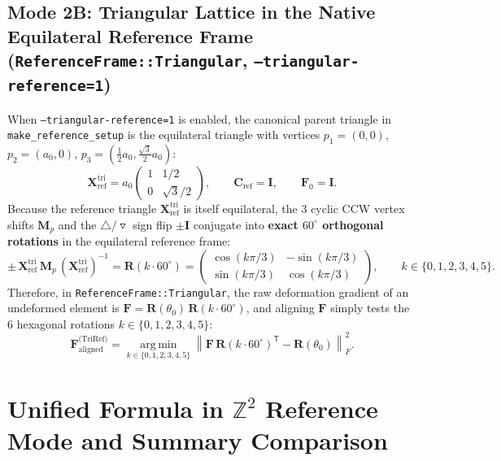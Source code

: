 \documentclass[11pt,a4paper]{article}
\newcommand{\Z}{\mathbb{Z}}
\newcommand{\T}{^{\mathsf T}}
\newcommand{\code}[1]{\texttt{#1}}
\begin{document}
\subsection{Mode 2B: Triangular Lattice in the Native Equilateral Reference Frame (\code{ReferenceFrame::Triangular}, \code{--triangular-reference=1})}
When \code{--triangular-reference=1} is enabled, the canonical parent triangle in \code{make\_reference\_setup} is the equilateral triangle with vertices $p_1=(0,0)$, $p_2=(a_0,0)$, $p_3=(\tfrac{1}{2}a_0, \tfrac{\sqrt{3}}{2}a_0)$:
\begin{equation}
  \mathbf{X}_{\text{ref}}^{\text{tri}} = a_0
  \begin{pmatrix}
    1 & 1/2 \\
    0 & \sqrt{3}/2
  \end{pmatrix},
  \qquad
  \mathbf{C}_{\text{ref}} = \mathbf{I},
  \qquad
  \mathbf{F}_0 = \mathbf{I}.
\end{equation}
Because the reference triangle $\mathbf{X}_{\text{ref}}^{\text{tri}}$ is itself equilateral, the 3 cyclic CCW vertex shifts $\mathbf{M}_p$ and the $\triangle / \triangledown$ sign flip $\pm\mathbf{I}$ conjugate into \textbf{exact $60^\circ$ orthogonal rotations} in the equilateral reference frame:
\begin{equation}
  \pm\,\mathbf{X}_{\text{ref}}^{\text{tri}}\,\mathbf{M}_p\,(\mathbf{X}_{\text{ref}}^{\text{tri}})^{-1}
  = \mathbf{R}(k \cdot 60^\circ)
  = \begin{pmatrix}
    \cos(k\pi/3) & -\sin(k\pi/3) \\
    \sin(k\pi/3) & \cos(k\pi/3)
  \end{pmatrix},
  \qquad k \in \{0, 1, 2, 3, 4, 5\}.
\end{equation}
Therefore, in \code{ReferenceFrame::Triangular}, the raw deformation gradient of an undeformed element is $\mathbf{F} = \mathbf{R}(\theta_0)\,\mathbf{R}(k \cdot 60^\circ)$, and aligning $\mathbf{F}$ simply tests the 6 hexagonal rotations $k \in \{0, 1, 2, 3, 4, 5\}$:
\begin{equation}
  \boxed{
  \mathbf{F}_{\text{aligned}}^{\text{(TriRef)}}
  = \operatorname*{arg\,min}_{k \in \{0,1,2,3,4,5\}}
  \left\| \mathbf{F}\,\mathbf{R}(k \cdot 60^\circ)\T - \mathbf{R}(\theta_0) \right\|_F^2.
  }
  \label{eq:f_aligned_tri_ref}
\end{equation}

\section{Unified Formula in $\Z^2$ Reference Mode and Summary Comparison}
\end{document}
